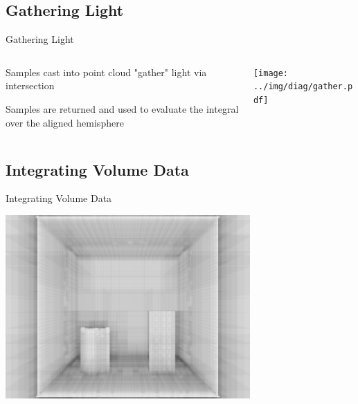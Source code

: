 \documentclass[10pt,handout,compress,professionalfont]{beamer}
\begin{document}
\subsection{Gathering Light}
\begin{frame}{Gathering Light}

    \begin{columns}
        \begin{column}{0.5\textwidth}

    \vspace{-5mm}
    Samples cast into point cloud "gather" light via intersection\\
    \vspace{8mm}

    Samples are returned and used to evaluate the integral over the aligned hemisphere

        \end{column}
        \begin{column}{0.5\textwidth}
            \texttt{[image: ../img/diag/gather.pdf]}\\
            \vspace{-4mm}
        \end{column}
    \end{columns}

    \centering
    

\end{frame}




\subsection{Integrating Volume Data}
\begin{frame}{Integrating Volume Data}

    \centering
    \includegraphics[height=70mm]{../img/testing.png}

\end{frame}
\end{document}
